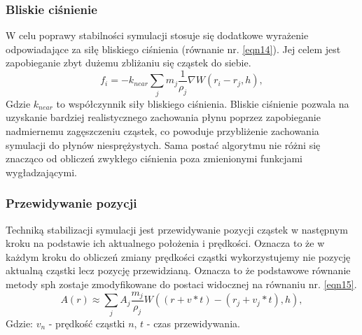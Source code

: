 \documentclass{article}
\begin{document}
\subsubsection{Bliskie ciśnienie}
W celu poprawy stabilności symulacji stosuje się dodatkowe wyrażenie odpowiadające za siłę bliskiego ciśnienia (równanie nr. \ref{eqn14}). 
Jej celem jest zapobieganie zbyt dużemu zbliżaniu się cząstek do siebie.\newline
\begin{equation}\label{eqn14}
f_i = -k_{near}\sum_j m_j \frac{1}{\rho_j}\nabla W(r_i - r_j, h),
\end{equation}
Gdzie $k_{near}$ to współczynnik siły bliskiego ciśnienia.\newline
Bliskie ciśnienie pozwala na uzyskanie bardziej realistycznego zachowania płynu poprzez zapobieganie nadmiernemu zagęszczeniu cząstek, co powoduje przybliżenie zachowania symulacji do płynów niesprężystych.\newline
\noindent
Sama postać algorytmu nie różni się znacząco od obliczeń zwykłego ciśnienia poza zmienionymi funkcjami wygładzającymi.\newline

\subsubsection{Przewidywanie pozycji}
Techniką stabilizacji symulacji jest przewidywanie pozycji cząstek\cite{viscoelastic} w następnym kroku na podstawie ich aktualnego położenia i prędkości.\newline
Oznacza to że w każdym kroku do obliczeń zmiany prędkości cząstki wykorzystujemy nie pozycję aktualną cząstki lecz pozycję przewidzianą.\newline
Oznacza to że podstawowe równanie metody sph zostaje zmodyfikowane do postaci widocznej na równaniu nr. \ref{eqn15}.\newline
\begin{equation}\label{eqn15}
A(r) \approx \sum_{j}A_j \frac{m_j}{\rho_j}W((r+v*t)-(r_j+v_j*t),h),
\end{equation}
\indent
Gdzie:\newline
$v_n$ - prędkość cząstki $n$,\newline
$t$ - czas przewidywania.\newline
\end{document}
